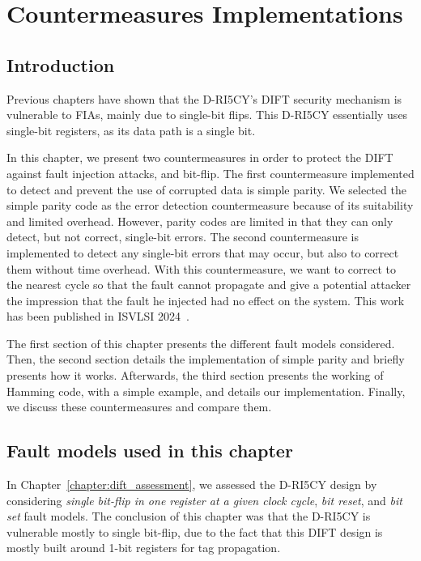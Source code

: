 \chapter{Countermeasures Implementations}
\label{chapter:countermeasures}
\minitoc

\section{Introduction}
Previous chapters have shown that the D-RI5CY's DIFT security mechanism is vulnerable to FIAs, mainly due to single-bit flips. This D-RI5CY essentially uses single-bit registers, as its data path is a single bit.

In this chapter, we present two countermeasures in order to protect the DIFT against fault injection attacks, and bit-flip.
The first countermeasure implemented to detect and prevent the use of corrupted data is simple parity. We selected the simple parity code as the error detection countermeasure because of its suitability and limited overhead. However, parity codes are limited in that they can only detect, but not correct, single-bit errors.
The second countermeasure is implemented to detect any single-bit errors that may occur, but also to correct them without time overhead. With this countermeasure, we want to correct to the nearest cycle so that the fault cannot propagate and give a potential attacker the impression that the fault he injected had no effect on the system.
This work has been published in ISVLSI 2024~\cite{PRLG-24-isvlsi}.

The first section of this chapter presents the different fault models considered. Then, the second section details the implementation of simple parity and briefly presents how it works. Afterwards, the third section presents the working of Hamming code, with a simple example, and details our implementation. Finally, we discuss these countermeasures and compare them.

\section{Fault models used in this chapter}
In Chapter~\ref{chapter:dift_assessment}, we assessed the D-RI5CY design by considering \textit{single bit-flip in one register at a given clock cycle}, \textit{bit reset}, and \textit{bit set} fault models. The conclusion of this chapter was that the D-RI5CY is vulnerable mostly to single bit-flip, due to the fact that this DIFT design is mostly built around 1-bit registers for tag propagation.

